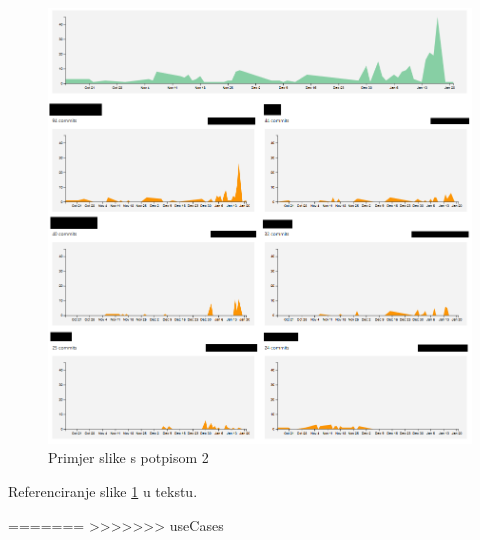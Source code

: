 		\begin{figure}[H]
			\includegraphics[width=\textwidth]{slike/aktivnost.PNG} %
			\caption{Primjer slike s potpisom 2}
			\label{fig:promjene2} %
		\end{figure}
		
		Referenciranje slike \ref{fig:promjene2} u tekstu.
		
		\eject

=======
>>>>>>> useCases
		
